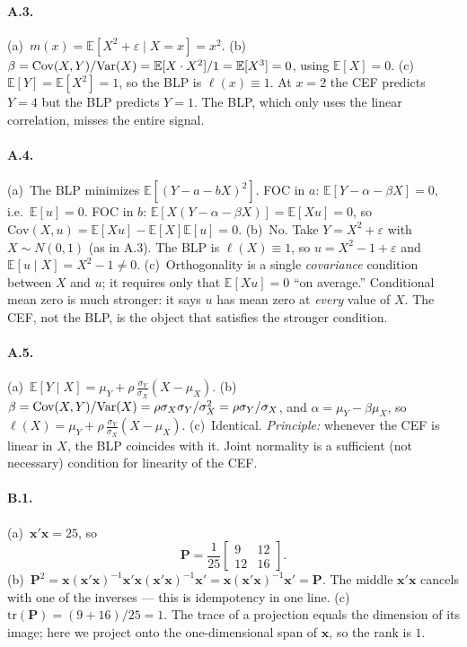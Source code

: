 \documentclass{article}
\newcommand{\E}{\mathbb{E}}
\begin{document}
\paragraph{A.3.}  (a)~$m(x) = \E[X^2 + \varepsilon \mid X = x] = x^2$.  (b)~$\beta = \text{Cov}(X,Y)/\Var(X) = \E[X \cdot X^2] / 1 = \E[X^3] = 0$, using $\E[X]=0$.  (c)~$\E[Y] = \E[X^2] = 1$, so the BLP is $\ell(x) \equiv 1$.  At $x = 2$ the CEF predicts $Y = 4$ but the BLP predicts $Y = 1$.  The BLP, which only uses the linear correlation, misses the entire signal.

\paragraph{A.4.}  (a)~The BLP minimizes $\E[(Y - a - bX)^2]$.  FOC in $a$: $\E[Y - \alpha - \beta X] = 0$, i.e.\ $\E[u] = 0$.  FOC in $b$: $\E[X(Y - \alpha - \beta X)] = \E[Xu] = 0$, so $\text{Cov}(X,u) = \E[Xu] - \E[X]\E[u] = 0$.  (b)~No.  Take $Y = X^2 + \varepsilon$ with $X \sim N(0,1)$ (as in A.3).  The BLP is $\ell(X) \equiv 1$, so $u = X^2 - 1 + \varepsilon$ and $\E[u \mid X] = X^2 - 1 \neq 0$.  (c)~Orthogonality is a single \emph{covariance} condition between $X$ and $u$; it requires only that $\E[Xu] = 0$ ``on average.''  Conditional mean zero is much stronger: it says $u$ has mean zero at \emph{every} value of $X$.  The CEF, not the BLP, is the object that satisfies the stronger condition.

\paragraph{A.5.}  (a)~$\E[Y \mid X] = \mu_Y + \rho\,\frac{\sigma_Y}{\sigma_X}(X - \mu_X)$.  (b)~$\beta = \text{Cov}(X,Y)/\mbox{Var}(X) = \rho\sigma_X\sigma_Y/\sigma_X^2 = \rho\sigma_Y/\sigma_X$, and $\alpha = \mu_Y - \beta\mu_X$, so $\ell(X) = \mu_Y + \rho\,\frac{\sigma_Y}{\sigma_X}(X - \mu_X)$.  (c)~Identical.  \emph{Principle:} whenever the CEF is linear in $X$, the BLP coincides with it.  Joint normality is a sufficient (not necessary) condition for linearity of the CEF.

\bigskip

\paragraph{B.1.}  (a)~$\bm{x}'\bm{x} = 25$, so
$$\bm{P} = \frac{1}{25}\begin{bmatrix}9 & 12 \\ 12 & 16\end{bmatrix}.$$
(b)~$\bm{P}^2 = \bm{x}(\bm{x}'\bm{x})^{-1}\bm{x}'\bm{x}(\bm{x}'\bm{x})^{-1}\bm{x}' = \bm{x}(\bm{x}'\bm{x})^{-1}\bm{x}' = \bm{P}$.  The middle $\bm{x}'\bm{x}$ cancels with one of the inverses --- this is idempotency in one line.  (c)~$\text{tr}(\bm{P}) = (9 + 16)/25 = 1$.  The trace of a projection equals the dimension of its image; here we project onto the one-dimensional span of $\bm{x}$, so the rank is $1$.
\end{document}
